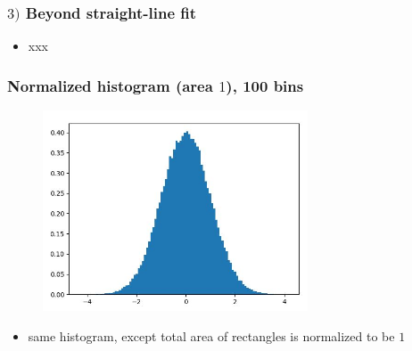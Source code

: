 \documentclass[english,14pt]{beamer}
\begin{document}

\begin{frame}[fragile]

\frametitle{$3)$ Beyond straight-line fit}

\begin{itemize}
	\item xxx
\end{itemize}

\end{frame}


\begin{frame}[fragile]

\frametitle{Normalized histogram (area $1$), 100 bins}

\begin{figure}[ht]
	\centering
	\includegraphics[width=0.7\textwidth]{figures/hist100BinsDensity}
\end{figure}

\vspace*{-5mm}

\begin{itemize}
	\item same histogram, except total area of rectangles is normalized to be $1$
\end{itemize}

\end{frame}


\end{document}
